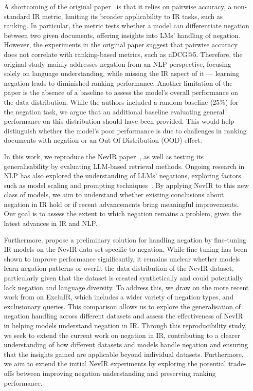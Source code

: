 A shortcoming of the original paper~\cite{weller2024nevirnegationneuralinformation} is that it relies on pairwise accuracy, a non-standard IR metric, limiting its broader applicability to IR tasks, such as ranking. In particular, the metric tests whether a model can differentiate negation between two given documents, offering insights into LMs' handling of negation. However, the experiments in the original paper suggest that pairwise accuracy does not correlate with ranking-based metrics, such as nDCG@5. Therefore, the original study mainly addresses negation from an NLP perspective, focusing solely on language understanding, while missing the IR aspect of it --- learning negation leads to diminished ranking performance.
Another limitation of the paper is the absence of a baseline to assess the model's overall performance on the data distribution. While the authors included a random baseline (25\%) for the negation task, we argue that an additional baseline evaluating general performance on this distribution should have been provided. This would help distinguish whether the model’s poor performance is due to challenges in ranking documents with negation or an Out-Of-Distribution (OOD) effect.

In this work, we reproduce the NevIR paper~\cite{weller2024nevirnegationneuralinformation},
as well as testing its generalisability by evaluating LLM-based retrieval methods. Ongoing research in NLP has also explored the understanding of LLMs' negations, exploring factors such as model scaling and prompting techniques~\cite{truong2023language,wei2022inverse}. By applying NevIR to this new class of models, we aim to understand whether existing conclusions about negation in IR hold or if recent advancements bring meaningful improvements. Our goal is to assess the extent to which negation remains a problem, given the latest advances in IR and NLP.

Furthermore, \citet{weller2024nevirnegationneuralinformation} propose a preliminary solution for handling negation by fine-tuning IR models on the NevIR data set specific to negation. While fine-tuning has been shown to improve performance significantly, it remains unclear whether models learn negation patterns or overfit the data distribution of the NevIR dataset, particularly given that the dataset is created synthetically and could potentially lack negation and language diversity. To address this, we draw on the more recent work from \citet{zhang2024excluir} on ExcluIR, which includes a wider variety of negation types, and exclusionary queries. This comparison allows us to explore the generalisation of negation handling across different datasets and assess the effectiveness of NevIR in helping models understand negation in IR. Through this reproducibility study, we seek to extend the current work on negation in IR, contributing to a clearer understanding of how different datasets and models handle negation and ensuring that the insights gained are applicable beyond individual datasets. Furthermore, we aim to extend the initial NevIR experiments by exploring the potential trade-offs between improving negation understanding and preserving ranking performance. 






